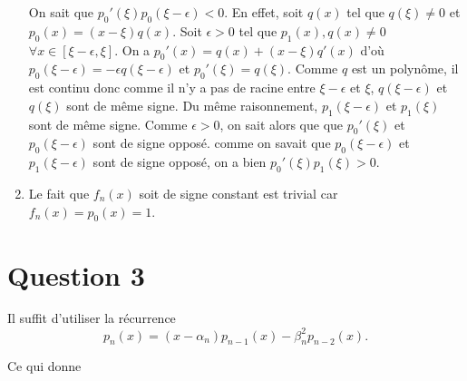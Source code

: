 \documentclass{article}
\begin{document}
\begin{enumerate}
    On sait que $p_0'(\xi)p_0(\xi - \epsilon) < 0$.
    En effet, soit $q(x)$ tel que $q(\xi) \neq 0$ et
    $p_0(x) = (x - \xi) q(x)$.
    Soit $\epsilon > 0$ tel que
    $p_1(x), q(x) \neq 0$ $\forall x \in [\xi - \epsilon, \xi]$.
    On a $p_0'(x) = q(x) + (x - \xi) q'(x)$ d'où
    $p_0(\xi - \epsilon) = -\epsilon q(\xi - \epsilon)$ et
    $p_0'(\xi) = q(\xi)$.
    Comme $q$ est un polynôme, il est continu donc comme il n'y a pas
    de racine entre $\xi - \epsilon$ et $\xi$, $q(\xi - \epsilon)$ et $q(\xi)$
    sont de même signe.
    Du même raisonnement, $p_1(\xi - \epsilon)$ et $p_1(\xi)$ sont
    de même signe.
    Comme $\epsilon > 0$, on sait alors que que
    $p_0'(\xi)$ et $p_0(\xi - \epsilon)$ sont de signe opposé.
    comme on savait que $p_0(\xi - \epsilon)$ et $p_1(\xi - \epsilon)$ sont
    de signe opposé, on a bien $p_0'(\xi) p_1(\xi) > 0$.
  \item Le fait que $f_n(x)$ soit de signe constant est trivial car
    $f_n(x) = p_0(x) = 1$.
\end{enumerate}

\section*{Question 3}
Il suffit d'utiliser la récurrence
\[ p_n(x) = (x - \alpha_n)p_{n-1}(x) - \beta_n^2 p_{n-2}(x). \]

Ce qui donne

\end{document}
